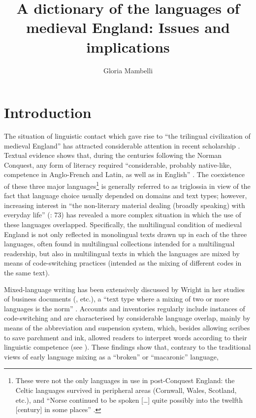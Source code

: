\documentclass[output=paper,colorlinks,citecolor=brown,arabicfont,chinesefont]{langscibook}
\author{Gloria Mambelli\affiliation{University of Verona, Italy }}
\title[A dictionary of the languages of medieval England]
      {A dictionary of the languages of medieval England: Issues and implications}
\begin{document}
 
\maketitle

\section{Introduction}

The situation of linguistic contact which gave rise to “the trilingual civilization of medieval England” \citep[164]{Rothwell1998} has attracted considerable attention in recent scholarship \citep{Trotter2000b, Wogan-browne2009, Ingham2010, JeffersonPutter2013, Wright2020b}. Textual evidence shows that, during the centuries following the Norman Conquest, any form of literacy required “considerable, probably native-like, competence in Anglo-French and Latin, as well as in English” \citep[229]{Durkin2014}. The coexistence of these three major languages\footnote{These were not the only languages in use in post-Conquest England: the Celtic languages survived in peripheral areas (Cornwall, Wales, Scotland, etc.), and “Norse continued to be spoken […] quite possibly into the twelfth [century] in some places” \citep[66]{Townend2006}.}  is generally referred to as triglossia in view of the fact that language choice usually depended on domains and text types; however, increasing interest in “the non-literary material dealing (broadly speaking) with everyday life” (\citealt{Trotter2006}: 73) has revealed a more complex situation in which the use of these languages overlapped. Specifically, the multilingual condition of medieval England is not only reflected in monolingual texts drawn up in each of the three languages, often found in multilingual collections intended for a multilingual readership, but also in multilingual texts in which the languages are mixed by means of code-switching practices (intended as the mixing of different codes in the same text).

Mixed-language writing has been extensively discussed by Wright in her studies of business documents (\citealt{Wright2000,Wright2002, Wright2011,Wright2013a, Wright2013b}, etc.), a “text type where a mixing of two or more languages is the norm” \citep[149]{Wright2000}. Accounts and inventories regularly include instances of code-switching and are characterised by considerable language overlap, mainly by means of the abbreviation and suspension system, which, besides allowing scribes to save parchment and ink, allowed readers to interpret words according to their linguistic competence (see \citealt{Wright2000}). These findings show that, contrary to the traditional views of early language mixing as a “broken” or “macaronic” language,
\end{document}
